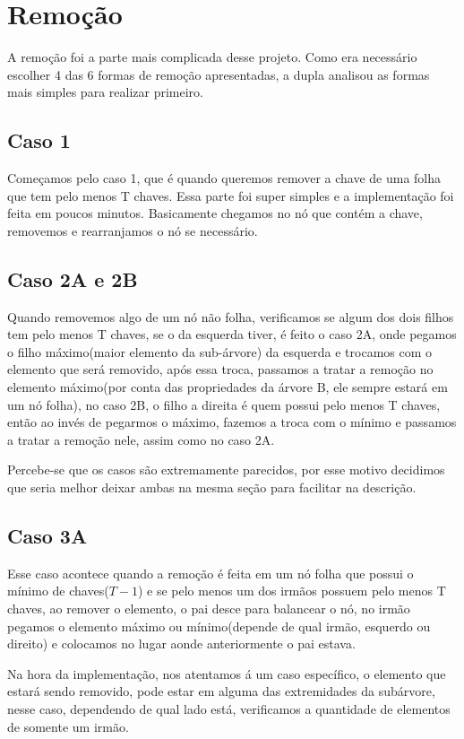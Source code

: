 \section{Remoção}
A remoção foi a parte mais complicada desse projeto. Como era necessário escolher 4 das 6 formas de remoção apresentadas, a dupla analisou as formas mais simples para realizar primeiro.

\subsection{Caso 1}
Começamos pelo caso 1, que é quando queremos remover a chave de uma folha que tem pelo menos T chaves. Essa parte foi super simples e a implementação foi feita em poucos minutos. Basicamente chegamos no nó que contém a chave, removemos e rearranjamos o nó se necessário.

\subsection{Caso 2A e 2B}
Quando removemos algo de um nó não folha, verificamos se algum dos dois filhos tem pelo menos T chaves, se o da esquerda tiver, é feito o caso 2A, onde pegamos o filho máximo(maior elemento da sub-árvore) da esquerda e trocamos com o elemento que será removido, após essa troca, passamos a tratar a remoção no elemento máximo(por conta das propriedades da árvore B, ele sempre estará em um nó folha), no caso 2B, o filho a direita é quem possui pelo menos T chaves, então ao invés de pegarmos o máximo, fazemos a troca com o mínimo e passamos a tratar a remoção nele, assim como no caso 2A. 
\par
Percebe-se que os casos são extremamente parecidos, por esse motivo decidimos que seria melhor deixar ambas na mesma seção para facilitar na descrição.
\subsection{Caso 3A}
Esse caso acontece quando a remoção é feita em um nó folha que possui o mínimo de chaves($T-1$) e se pelo menos um dos irmãos possuem pelo menos T chaves, ao remover o elemento, o pai desce para balancear o nó, no irmão pegamos o elemento máximo ou mínimo(depende de qual irmão, esquerdo ou direito) e colocamos no lugar aonde anteriormente o pai estava.
\par
Na hora da implementação, nos atentamos á um caso específico, o elemento que estará sendo removido, pode estar em alguma das extremidades da subárvore, nesse caso, dependendo de qual lado está, verificamos a quantidade de elementos de somente um irmão. 
